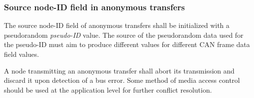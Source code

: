 \subsubsection{Source node-ID field in anonymous transfers}\label{sec:transport_can_source_node_pseudo_id}

The source node-ID field of anonymous transfers shall be initialized with a pseudorandom \emph{pseudo-ID} value.
The source of the pseudorandom data used for the pseudo-ID must aim to produce different values
for different CAN frame data field values.

A node transmitting an anonymous transfer shall abort its transmission and discard it upon detection of a bus error.
Some method of media access control should be used at the application level for further conflict resolution.

